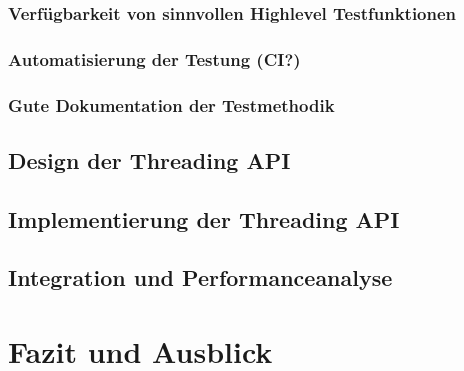 \documentclass[12pt,a4paper,listof=totocnumbered,parskip=half]{scrreprt}
\begin{document}
\subsection{Verfügbarkeit von sinnvollen Highlevel Testfunktionen}
\subsection{Automatisierung der Testung (CI?)}
\subsection{Gute Dokumentation der Testmethodik}
\section{Design der Threading API}
\section{Implementierung der Threading API}
\section{Integration und Performanceanalyse}

\chapter{Fazit und Ausblick}

\printnoidxglossaries

\printbibliography[title={Literaturverzeichnis},heading=bibintoc,notkeyword=online]

\printbibliography[title={Quellenverzeichnis},heading=bibintoc,keyword=online] 
\end{document}
